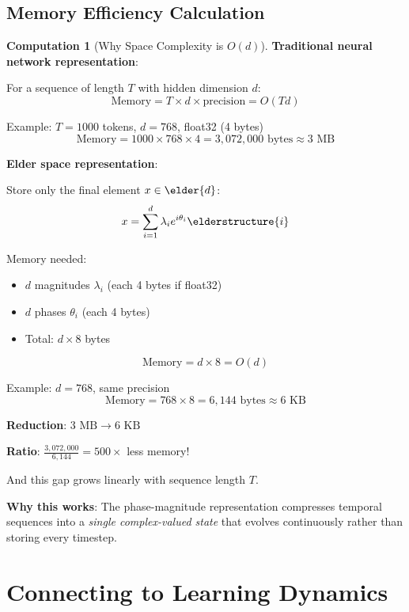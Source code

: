 \documentclass[12pt,a4paper]{article}
\theoremstyle{definition}
\newtheorem{computation}{Computation}[section]
\theoremstyle{remark}
\begin{document}
\subsection{Memory Efficiency Calculation}

\begin{computation}[Why Space Complexity is $O(d)$]

\textbf{Traditional neural network representation}:

For a sequence of length $T$ with hidden dimension $d$:
$$\text{Memory} = T \times d \times \text{precision} = O(Td)$$

Example: $T=1000$ tokens, $d=768$, float32 (4 bytes)
$$\text{Memory} = 1000 \times 768 \times 4 = 3,072,000 \text{ bytes} \approx 3 \text{ MB}$$

\textbf{Elder space representation}:

Store only the final element $x \in \elder{d}$:
$$x = \sum_{i=1}^{d} \lambda_i e^{i\theta_i} \elderstructure{i}$$

Memory needed:
\begin{itemize}
\item $d$ magnitudes $\lambda_i$ (each 4 bytes if float32)
\item $d$ phases $\theta_i$ (each 4 bytes)
\item Total: $d \times 8$ bytes
\end{itemize}

$$\text{Memory} = d \times 8 = O(d)$$

Example: $d=768$, same precision
$$\text{Memory} = 768 \times 8 = 6,144 \text{ bytes} \approx 6 \text{ KB}$$

\textbf{Reduction}: $3 \text{ MB} \to 6 \text{ KB}$

\textbf{Ratio}: $\frac{3,072,000}{6,144} = 500\times$ less memory!

And this gap grows linearly with sequence length $T$.

\textbf{Why this works}: The phase-magnitude representation compresses temporal sequences into a \textit{single complex-valued state} that evolves continuously rather than storing every timestep.
\end{computation}

\newpage
\section{Connecting to Learning Dynamics}
\end{document}
